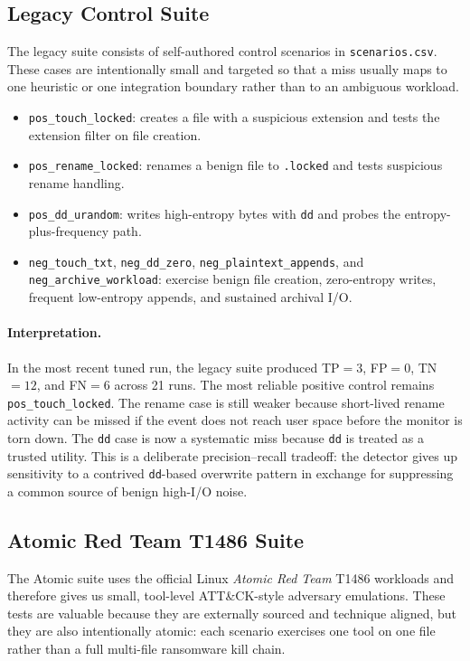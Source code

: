 \documentclass[twocolumn, 10pt]{scrartcl}
\begin{document}
\subsection{Legacy Control Suite}
The legacy suite consists of self-authored control scenarios in \texttt{scenarios.csv}. These cases are intentionally small and targeted so that a miss usually maps to one heuristic or one integration boundary rather than to an ambiguous workload.

\begin{itemize}
    \item \texttt{pos\_touch\_locked}: creates a file with a suspicious extension and tests the extension filter on file creation.
    \item \texttt{pos\_rename\_locked}: renames a benign file to \texttt{.locked} and tests suspicious rename handling.
    \item \texttt{pos\_dd\_urandom}: writes high-entropy bytes with \texttt{dd} and probes the entropy-plus-frequency path.
    \item \texttt{neg\_touch\_txt}, \texttt{neg\_dd\_zero}, \texttt{neg\_plaintext\_appends}, and \texttt{neg\_archive\_workload}: exercise benign file creation, zero-entropy writes, frequent low-entropy appends, and sustained archival I/O.
\end{itemize}

\paragraph{Interpretation.}
In the most recent tuned run, the legacy suite produced TP$=3$, FP$=0$, TN$=12$, and FN$=6$ across 21 runs. The most reliable positive control remains \texttt{pos\_touch\_locked}. The rename case is still weaker because short-lived rename activity can be missed if the event does not reach user space before the monitor is torn down. The \texttt{dd} case is now a systematic miss because \texttt{dd} is treated as a trusted utility. This is a deliberate precision--recall tradeoff: the detector gives up sensitivity to a contrived \texttt{dd}-based overwrite pattern in exchange for suppressing a common source of benign high-I/O noise.

\subsection{Atomic Red Team T1486 Suite}
The Atomic suite uses the official Linux \emph{Atomic Red Team} T1486 workloads and therefore gives us small, tool-level ATT\&CK-style adversary emulations. These tests are valuable because they are externally sourced and technique aligned, but they are also intentionally atomic: each scenario exercises one tool on one file rather than a full multi-file ransomware kill chain.
\end{document}
